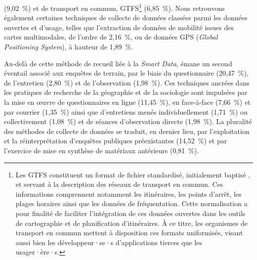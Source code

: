 \begin{refsegment}
{} (9,02~\%) et de transport en commun, \acrfull{GTFS}\footnote{
    Les \acrshort{GTFS} constituent un format de fichier standardisé, initialement baptisé , et servant à la description des réseaux de transport en commun. Ces informations comprennent notamment les itinéraires, les points d'arrêt, les plages horaires ainsi que les données de fréquentation. Cette normalisation a pour finalité de faciliter l'intégration de ces données ouvertes dans les outils de \gls{cartographie} et de planification d'itinéraires. À ce titre, les organismes de transport en commun mettent à disposition ces formats uniformisés, visant aussi bien les développeur·se·s d'applications tierces que les usager·ère·s.
} (6,85~\%). Nous retrouvons également certaines techniques de collecte de données classées parmi les données ouvertes et d'usage, telles que l'extraction de données de mobilité issues des cartes multimodales, de l'ordre de 2,16~\%, ou de données \acrshort{GPS} (\textsl{Global Positioning System}), à hauteur de 1,89~\%.%

Au-delà de cette méthode de recueil liée à la \textsl{Smart Data}, émane un second éventail associé aux enquêtes de terrain, par le biais du questionnaire (20,47~\%), de l'entretien (2,80~\%) et de l'observation (1,98~\%). Ces techniques ancrées dans les pratiques de recherche de la géographie et de la sociologie sont impulsées par la mise en œuvre de questionnaires en ligne (11,45~\%), en face-à-face (7,66~\%) et par courrier (1,35~\%) ainsi que d'entretiens menés individuellement (1,71~\%) ou collectivement (1,08~\%) et de séances d'observation directe (1,98~\%). La pluralité des méthodes de collecte de données se traduit, en dernier lieu, par l'exploitation et la réinterprétation d'enquêtes publiques préexistantes (14,52~\%) et par l'exercice de mise en synthèse de matériaux antérieurs (0,81~\%).%
    

\end{refsegment}
